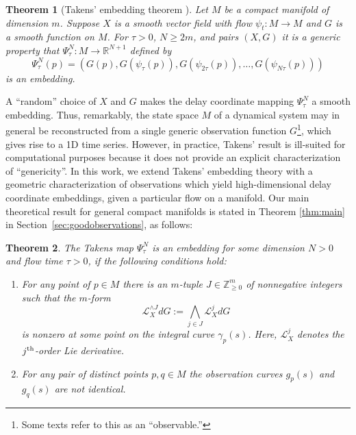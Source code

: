 \documentclass[11pt]{article}
\newtheorem*{theorem*}{Theorem}
\theoremstyle{definition}
\theoremstyle{remark}
\newcommand{\RR}{\mathbb{R}}
\newcommand{\ZZ}{\mathbb{Z}}
\newcommand{\Ld}{\mathcal{L}}
\begin{document}
    \begin{theorem*}[Takens' embedding theorem \cite{takens1981detecting}]\label{thm:takens}
        Let $M$ be a compact manifold of dimension $m$. Suppose $X$ is a smooth vector field with flow $\psi_t: M \rightarrow M$ and $G$ is a smooth function on $M$. For $\tau>0$, $N \geq 2m$, and pairs $(X,G)$ it is a generic property that $\Psi^N_\tau: M \rightarrow \RR^{N+1}$ defined by
        \[ \Psi^N_\tau(p) = (G(p), G(\psi_\tau(p)), G(\psi_{2\tau}(p)), \ldots, G(\psi_{N\tau}(p)))\]
        is an embedding.
    \end{theorem*}
    A ``random'' choice of $X$ and $G$ makes the delay coordinate mapping $\Psi^N_\tau$ a smooth embedding. Thus, remarkably, the state space $M$ of a dynamical system may in general be reconstructed from a single generic observation function $G$\footnote{Some texts refer to this as an ``observable.''}, which gives rise to a 1D time series. However, in practice, Takens' result is ill-suited for computational purposes because it does not provide an explicit characterization of ``genericity''.
    In this work, we extend Takens' embedding theory with a geometric characterization of observations which yield high-dimensional delay coordinate embeddings, given a particular flow on a manifold. Our main theoretical result for general compact manifolds is stated in Theorem \ref{thm:main} in Section~\ref{sec:goodobservations}, as follows:
    
     \begin{theorem*}
    The Takens map $\Psi_{\tau}^{N}$ is an embedding for some dimension $N>0$ and flow time $\tau>0$, if the following conditions hold:
        \begin{enumerate}
        \item For any point of $p\in M$ there is an $m$-tuple $J\in \ZZ_{\geq 0}^m$ of nonnegative integers such that the $m$-form
        \[\Ld_{X}^{\wedge J}dG := \bigwedge_{j\in J}\Ld_X^jdG\]
        is nonzero at some point on the integral curve $\gamma_p(s)$. Here, $\mathcal{L}_X^j$ denotes the $j^{\textnormal{th}}$-order Lie derivative.

        \item For any pair of distinct points $p, q\in M$ the observation curves $g_p(s)$ and $g_q(s)$ are not identical.
        \end{enumerate}
    \end{theorem*}
    
\end{document}
